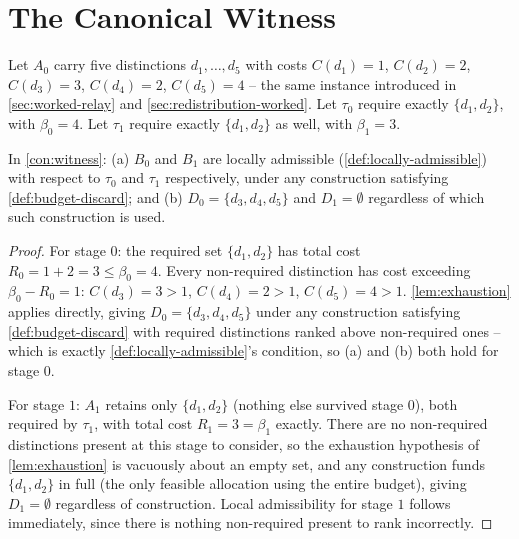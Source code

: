 \section{The Canonical Witness}

\begin{construction}
\label{con:witness}
Let $A_0$ carry five distinctions $d_1, \ldots, d_5$ with costs
$C(d_1)=1$, $C(d_2)=2$, $C(d_3)=3$, $C(d_4)=2$, $C(d_5)=4$ -- the same
instance introduced in \cref{sec:worked-relay} and
\cref{sec:redistribution-worked}. Let $\tau_0$ require exactly $\{d_1,
d_2\}$, with $\beta_0 = 4$. Let $\tau_1$ require exactly $\{d_1, d_2\}$
as well, with $\beta_1 = 3$.
\end{construction}

\begin{proposition}
\label{prop:witness-properties}
In \cref{con:witness}: (a) $B_0$ and $B_1$ are locally admissible
(\cref{def:locally-admissible}) with respect to $\tau_0$ and $\tau_1$
respectively, under any construction satisfying \cref{def:budget-discard};
and (b) $D_0 = \{d_3, d_4, d_5\}$ and $D_1 = \emptyset$ regardless of
which such construction is used.
\end{proposition}

\begin{proof}
For stage $0$: the required set $\{d_1, d_2\}$ has total cost $R_0 =
1 + 2 = 3 \le \beta_0 = 4$. Every non-required distinction has cost
exceeding $\beta_0 - R_0 = 1$: $C(d_3)=3>1$, $C(d_4)=2>1$, $C(d_5)=4>1$.
\cref{lem:exhaustion} applies directly, giving $D_0 = \{d_3,d_4,d_5\}$
under any construction satisfying \cref{def:budget-discard} with required
distinctions ranked above non-required ones -- which is exactly
\cref{def:locally-admissible}'s condition, so (a) and (b) both hold for
stage $0$.

For stage $1$: $A_1$ retains only $\{d_1, d_2\}$ (nothing else survived
stage $0$), both required by $\tau_1$, with total cost $R_1 = 3 = \beta_1$
exactly. There are no non-required distinctions present at this stage to
consider, so the exhaustion hypothesis of \cref{lem:exhaustion} is
vacuously about an empty set, and any construction funds $\{d_1,d_2\}$ in
full (the only feasible allocation using the entire budget), giving
$D_1 = \emptyset$ regardless of construction. Local admissibility for
stage $1$ follows immediately, since there is nothing non-required
present to rank incorrectly.
\end{proof}

